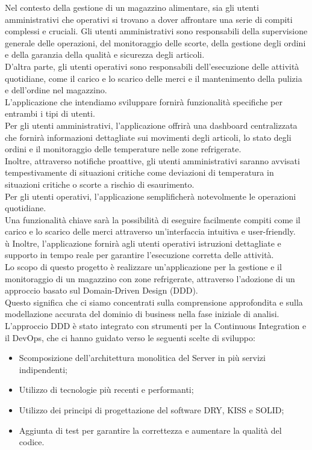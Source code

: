 Nel contesto della gestione di un magazzino alimentare, sia gli utenti amministrativi che operativi si trovano a dover
affrontare una serie di compiti complessi e cruciali. Gli utenti amministrativi sono responsabili della supervisione
generale delle operazioni, del monitoraggio delle scorte, della gestione degli ordini e della garanzia della qualità e
sicurezza degli articoli.\\ D'altra parte, gli utenti operativi sono responsabili dell'esecuzione delle attività
quotidiane, come il carico e lo scarico delle merci e il mantenimento della pulizia e dell'ordine nel magazzino.\\
L'applicazione che intendiamo sviluppare fornirà funzionalità specifiche per entrambi i tipi di utenti.\\
Per gli utenti amministrativi, l'applicazione offrirà una dashboard centralizzata che fornirà informazioni dettagliate
sui movimenti degli articoli, lo stato degli ordini e il monitoraggio delle temperature nelle zone refrigerate.\\
Inoltre, attraverso notifiche proattive, gli utenti amministrativi saranno avvisati tempestivamente di situazioni
critiche come deviazioni di temperatura in situazioni critiche o scorte a rischio di esaurimento.\\
Per gli utenti operativi, l'applicazione semplificherà notevolmente le operazioni quotidiane.\\
Una funzionalità chiave sarà la possibilità di eseguire facilmente compiti come il carico e lo scarico delle
merci attraverso un'interfaccia intuitiva e user-friendly.\\ù
Inoltre, l'applicazione fornirà agli utenti operativi istruzioni dettagliate e supporto in tempo reale per garantire l'esecuzione corretta delle attività.\\
Lo scopo di questo progetto è realizzare un'applicazione per la gestione e il monitoraggio di un magazzino con zone
refrigerate, attraverso l'adozione di un approccio basato sul Domain-Driven Design (DDD).\\
Questo significa che ci siamo concentrati sulla comprensione approfondita e sulla modellazione accurata del dominio di business nella fase iniziale di analisi.\\
L'approccio DDD è stato integrato con strumenti per la Continuous Integration e il DevOps, che ci hanno guidato verso le seguenti scelte di sviluppo:
\begin{itemize}
    \item Scomposizione dell’architettura monolitica del Server in più servizi indipendenti;
    \item Utilizzo di tecnologie più recenti e performanti;
    \item Utilizzo dei principi di progettazione del software DRY, KISS e SOLID;
    \item Aggiunta di test per garantire la correttezza e aumentare la qualità del codice.
\end{itemize}
\newpage
